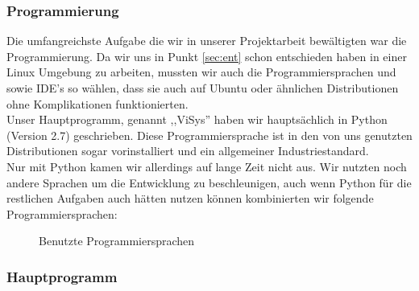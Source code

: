 \documentclass[a4paper,oneside,12pt,titlepage]{article}
\newcommand{\vsr}{ViSys}
\newcommand{\pyvidir}{../../Code/PyVi/}	%
\begin{document}
\subsubsection{Programmierung}
Die umfangreichste Aufgabe die wir in unserer Projektarbeit bewältigten war die Programmierung. Da wir uns in Punkt \ref{sec:ent}  schon entschieden haben in einer Linux Umgebung zu arbeiten, mussten wir auch die Programmiersprachen und sowie IDE's so wählen, dass sie auch auf Ubuntu oder ähnlichen Distributionen ohne Komplikationen funktionierten.\\
Unser Hauptprogramm, genannt ,,\vsr '' haben wir hauptsächlich in Python (Version 2.7) \cite{python27} geschrieben. Diese Programmiersprache ist in den von uns genutzten Distributionen sogar vorinstalliert und ein allgemeiner Industriestandard.\\
Nur mit Python kamen wir allerdings auf lange Zeit nicht aus. Wir nutzten noch andere Sprachen um die Entwicklung zu beschleunigen, auch wenn Python für die restlichen Aufgaben auch hätten nutzen können kombinierten wir folgende Programmiersprachen:
\begin{figure}[H]

\label{fig:pyvi}
\caption{Benutzte Programmiersprachen}
\end{figure}

\subsubsection*{Hauptprogramm}






\end{document}
